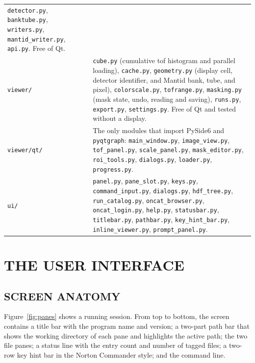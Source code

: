 \documentclass[tm]{ornltm}
\begin{document}
\begin{table}[ht]
\begin{tabular}{l p{}}
      \texttt{detector.py}, \texttt{banktube.py}, \texttt{writers.py},
      \texttt{mantid\_writer.py}, \texttt{api.py}. Free of Qt. \\
    \texttt{viewer/} & \texttt{cube.py} (cumulative \ac{tof} histogram and
      parallel loading), \texttt{cache.py}, \texttt{geometry.py} (display cell,
      detector identifier, and Mantid bank, tube, and pixel),
      \texttt{colorscale.py}, \texttt{tofrange.py}, \texttt{masking.py} (mask
      state, undo, reading and saving), \texttt{runs.py}, \texttt{export.py},
      \texttt{settings.py}. Free of Qt and tested without a display. \\
    \texttt{viewer/qt/} & The only modules that import PySide6 and
      \texttt{pyqtgraph}: \texttt{main\_window.py}, \texttt{image\_view.py},
      \texttt{tof\_panel.py}, \texttt{scale\_panel.py},
      \texttt{mask\_editor.py}, \texttt{roi\_tools.py}, \texttt{dialogs.py},
      \texttt{loader.py}, \texttt{progress.py}. \\
    \texttt{ui/} & \texttt{panel.py}, \texttt{pane\_slot.py},
      \texttt{keys.py}, \texttt{command\_input.py}, \texttt{dialogs.py},
      \texttt{hdf\_tree.py}, \texttt{run\_catalog.py},
      \texttt{oncat\_browser.py}, \texttt{oncat\_login.py}, \texttt{help.py},
      \texttt{statusbar.py}, \texttt{titlebar.py}, \texttt{pathbar.py},
      \texttt{key\_hint\_bar.py}, \texttt{inline\_viewer.py},
      \texttt{prompt\_panel.py}. \\
    \bottomrule
  \end{tabular}
\end{table}

\section{THE USER INTERFACE}
\label{sec:ui}

\subsection{SCREEN ANATOMY}

Figure~\ref{fig:panes} shows a running session. From top to bottom, the screen
contains a title bar with the program name and version; a two-part path bar that
shows the working directory of each pane and highlights the active path; the two
file panes; a status line with the entry count and number of tagged files; a
two-row key hint bar in the Norton Commander style; and the command line.
\end{document}
